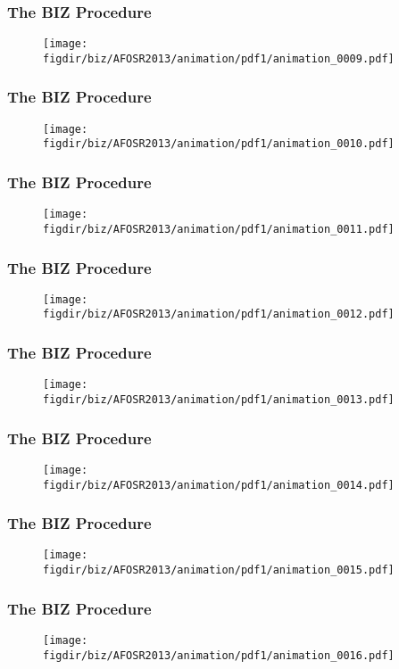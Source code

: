 \documentclass[13pt]{beamer}
\newcommand{\figdir}{../../fig}
\begin{document}
{\begin{frame}\frametitle{The BIZ Procedure}\begin{figure}\texttt{[image: \\figdir/biz/AFOSR2013/animation/pdf1/animation\_0009.pdf]}\end{figure}\end{frame}
\begin{frame}\frametitle{The BIZ Procedure}\begin{figure}\texttt{[image: \\figdir/biz/AFOSR2013/animation/pdf1/animation\_0010.pdf]}\end{figure}\end{frame}
\begin{frame}\frametitle{The BIZ Procedure}\begin{figure}\texttt{[image: \\figdir/biz/AFOSR2013/animation/pdf1/animation\_0011.pdf]}\end{figure}\end{frame}
\begin{frame}\frametitle{The BIZ Procedure}\begin{figure}\texttt{[image: \\figdir/biz/AFOSR2013/animation/pdf1/animation\_0012.pdf]}\end{figure}\end{frame}
\begin{frame}\frametitle{The BIZ Procedure}\begin{figure}\texttt{[image: \\figdir/biz/AFOSR2013/animation/pdf1/animation\_0013.pdf]}\end{figure}\end{frame}
\begin{frame}\frametitle{The BIZ Procedure}\begin{figure}\texttt{[image: \\figdir/biz/AFOSR2013/animation/pdf1/animation\_0014.pdf]}\end{figure}\end{frame}
\begin{frame}\frametitle{The BIZ Procedure}\begin{figure}\texttt{[image: \\figdir/biz/AFOSR2013/animation/pdf1/animation\_0015.pdf]}\end{figure}\end{frame}
\begin{frame}\frametitle{The BIZ Procedure}\begin{figure}\texttt{[image: \\figdir/biz/AFOSR2013/animation/pdf1/animation\_0016.pdf]}\end{figure}\end{frame}
}
\end{document}
